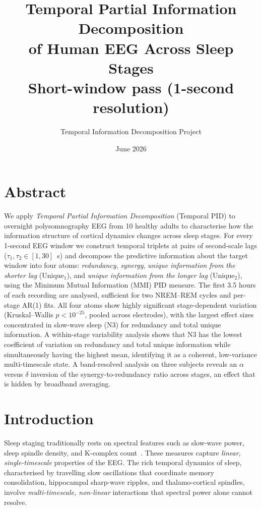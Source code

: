 \documentclass[11pt,a4paper]{article}
\title{\textbf{Temporal Partial Information Decomposition\\of Human EEG Across Sleep Stages}\\[4pt]
\large Short-window pass (1-second resolution)}
\author{Temporal Information Decomposition Project}
\date{June 2026}
\begin{document}
\maketitle
\tableofcontents
\newpage

\section{Abstract}

We apply \emph{Temporal Partial Information Decomposition} (Temporal PID) to
overnight polysomnography EEG from 10 healthy adults to characterise how the
information structure of cortical dynamics changes across sleep stages.
For every 1-second EEG window we construct temporal triplets at pairs of
second-scale lags ($\tau_1, \tau_2 \in [1, 30]$~s) and decompose the predictive
information about the target window into four atoms: \emph{redundancy},
\emph{synergy}, \emph{unique information from the shorter lag} (Unique$_1$),
and \emph{unique information from the longer lag} (Unique$_2$), using the
Minimum Mutual Information (MMI) PID measure.
The first 3.5 hours of each recording are analysed, sufficient for two
NREM--REM cycles and per-stage AR(1) fits.
All four atoms show highly significant stage-dependent variation
(Kruskal--Wallis $p < 10^{-25}$, pooled across electrodes), with the largest
effect sizes concentrated in slow-wave sleep (N3) for redundancy and total
unique information.  A within-stage variability analysis shows that N3 has
the lowest coefficient of variation on redundancy and total unique
information while simultaneously having the highest mean, identifying it as
a coherent, low-variance multi-timescale state.  A band-resolved analysis
on three subjects reveals an $\alpha$ versus $\delta$ inversion of the
synergy-to-redundancy ratio across stages, an effect that is hidden by
broadband averaging.

\section{Introduction}

Sleep staging traditionally rests on spectral features such as slow-wave power,
sleep spindle density, and K-complex count~\citep{berry2012aasm}.  These
measures capture \emph{linear, single-timescale} properties of the EEG.  The
rich temporal dynamics of sleep, characterised by travelling slow oscillations
that coordinate memory consolidation, hippocampal sharp-wave ripples, and
thalamo-cortical spindles, involve \emph{multi-timescale, non-linear}
interactions that spectral power alone cannot resolve.
\end{document}
